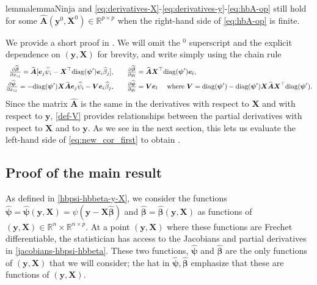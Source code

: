 \documentclass[11pt]{amsart}
\numberwithin{equation}{section}
\numberwithin{equation}{section}
\def\real{{\mathbb{R}}}
\def\R{{\real}}
\def\diag{\hbox{\rm diag}}
\def\mathbold{\boldsymbol} %
\def\bA{\mathbold{A}}\def\calA{{\cal A}}\def\scrA{{\mathscr A}}\def\Ahat{\widehat{A}}\def\Atil{{\widetilde A}}
\def\hbA{{\widehat{\bA}}}\def\tbA{{\widetilde{\bA}}}
\def\be{\mathbold{e}}
\def\bV{\mathbold{V}}\def\hbV{{\widehat{\bV}}}\def\tbV{{\widetilde{\bV}}}
\def\bX{\mathbold{X}}\def\hbX{{\widehat{\bX}}}\def\tbX{{\widetilde{\bX}}}\def\bXbar{{\overline \bX}}
\def\by{\mathbold{y}}\def\yhat{\widehat{y}}\def\ytil{\widetilde{y}}\def\ybar{{\overline y}}\def\vby{{\bf y}}
\def\bbeta{\mathbold{\beta}}\def\betahat{\widehat{\beta}}\def\hbeta{\widehat{\beta}}
\def\hbbeta{{{\widehat{\bbeta}}}}
\def\bpsi{\mathbold{\psi}}\def\psihat{\widehat{\psi}}\def\hpsi{\widehat{\psi}}
\def\hbpsi{{\widehat{\bpsi}}}\def\tbpsi{{\widetilde{\bpsi}}}
\begin{document}
{\begin{restatable}{lemma}{lemmaNinja}
    and \eqref{eq:derivatives-X}-\eqref{eq:derivatives-y}-\eqref{eq:hbA-op} still hold
    for some $\hbA(\by^0,\bX^0)\in\R^{p\times p}$
    when the right-hand side of \eqref{eq:hbA-op} is finite.
\end{restatable}
We provide a short proof in .
We will omit the $^0$ superscript and the explicit dependence on $(\by,\bX)$
for brevity, and write simply using the chain rule
\begin{align}
    \tfrac{\partial\hbbeta }{\partial x_{ij}}
    = \hbA[\be_j\hpsi_i - \bX^\top\diag(\bpsi')\be_i \hbeta_j],
    \qquad
    &
    \tfrac{\partial\hbbeta }{\partial y_l}
    = \hbA\bX^\top\diag(\bpsi')\be_l,
    \label{def-V}
    \\
    \tfrac{\partial\hbpsi}{\partial x_{ij}}
    = -\diag(\bpsi')\bX\hbA\be_j\hpsi_i - \bV\be_i \hbeta_j,
    \qquad
    &
    \tfrac{\partial\hbpsi}{\partial y_l}
    = \bV\be_l
    \quad\text{ where }\bV = \diag(\bpsi')-\diag(\bpsi')\bX\hbA\bX^\top\diag(\bpsi').
    \nonumber
\end{align}
Since the matrix $\hbA$ is the same in the derivatives with respect to $\bX$
and with respect to $\by$, \eqref{def-V} provides 
relationships between
the partial derivatives with respect to $\bX$ and to $\by$.
As we see in the next section, this
lets us evaluate the left-hand side of \eqref{eq:new_cor_first}
to obtain .

\subsection{Proof of the main result}
\label{sec:proof-main-results}

As defined in \eqref{hbpsi-hbbeta-y-X}, we consider the functions
$\hbpsi=\hbpsi(\by,\bX)=\psi(\by-\bX\hbbeta)$ and $\hbbeta=\hbbeta(\by,\bX)$ as functions
of $(\by,\bX)\in\R^{n}\times \R^{n\times p}$.
At a point $(\by,\bX)$ where these functions are Frechet differentiable,
the statistician has access to the Jacobians and partial derivatives in \eqref{jacobians-hbpsi-hbbeta}.
These two functions, $\hbpsi$ and $\hbbeta$ are the only functions
of $(\by,\bX)$ that we will consider; the hat in $\hbpsi,\hbbeta$
emphasize that these are functions of $(\by,\bX)$.

}
\end{document}
